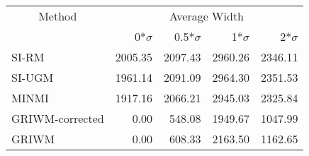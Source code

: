 
\begin{tabular}{lrrrr}
\toprule
\multicolumn{1}{c}{Method} & \multicolumn{4}{c}{Average Width} \\
 & 0*$\sigma$ & 0.5*$\sigma$ & 1*$\sigma$ & 2*$\sigma$\\
\midrule
SI-RM & 2005.35 & 2097.43 & 2960.26 & 2346.11\\
SI-UGM & 1961.14 & 2091.09 & 2964.30 & 2351.53\\
MINMI & 1917.16 & 2066.21 & 2945.03 & 2325.84\\
GRIWM-corrected & 0.00 & 548.08 & 1949.67 & 1047.99\\
GRIWM & 0.00 & 608.33 & 2163.50 & 1162.65\\
\bottomrule
\end{tabular}
